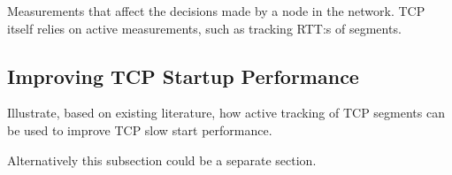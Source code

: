 Measurements that affect the decisions made by a node in the network. TCP itself relies on active measurements, such as tracking RTT:s of segments.

\subsection{Improving TCP Startup Performance}
Illustrate, based on existing literature, how active tracking of TCP segments can be used to improve TCP slow start performance. 

Alternatively this subsection could be a separate section.